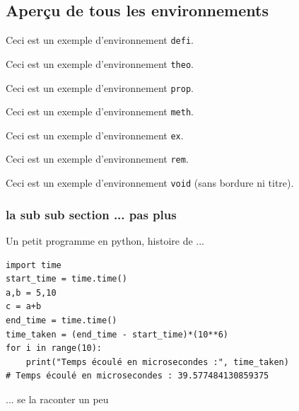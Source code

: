 \documentclass[10pt,a4paper]{article}
\begin{document}
\subsection{Aperçu de tous les environnements}

\begin{defi}
	Ceci est un exemple d'environnement \texttt{defi}.
\end{defi}

\begin{theo}
	Ceci est un exemple d'environnement \texttt{theo}.
\end{theo}

\begin{prop}
	Ceci est un exemple d'environnement \texttt{prop}.
\end{prop}

\begin{meth}
	Ceci est un exemple d'environnement \texttt{meth}.
\end{meth}

\begin{ex}
	Ceci est un exemple d'environnement \texttt{ex}.
\end{ex}

\begin{rem}[prout]
	Ceci est un exemple d'environnement \texttt{rem}.
\end{rem}

\begin{void}
	Ceci est un exemple d'environnement \texttt{void} (sans bordure ni titre).
\end{void}

\subsubsection{la sub sub section ... pas plus}

\begin{meth}
	Un petit programme en python, histoire de ...

	\begin{lstlisting}
import time
start_time = time.time()
a,b = 5,10
c = a+b
end_time = time.time()
time_taken = (end_time - start_time)*(10**6)
for i in range(10):
    print("Temps écoulé en microsecondes :", time_taken)
# Temps écoulé en microsecondes : 39.577484130859375
    \end{lstlisting}
	... se la raconter un peu
\end{meth}
\end{document}

